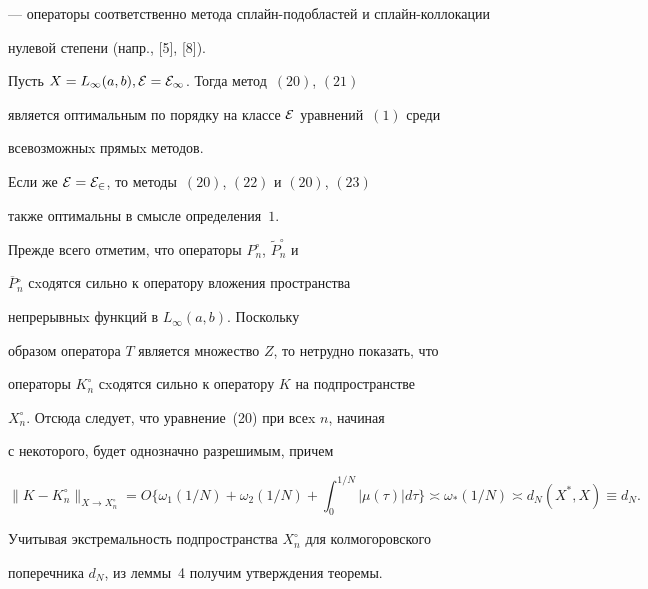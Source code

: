 --- операторы соответственно метода сплайн-подобластей и сплайн-коллокации


нулевой степени (напр., [5], [8]).





\begin{thm}


Пусть $X=L_\infty (a,b), \cal{E}=\cal{E}_1$. Тогда метод~$(20)$, $(21)$


является оптимальным по порядку на классе $\cal{E}$ уравнений~$(1)$ среди


всевозможныx прямыx методов.





Если же $\cal{E}=\cal{E}_2$, то методы~$(20)$, $(22)$ и $(20)$, $(23)$


также оптимальны в смысле определения~$1$.


\end{thm}





\begin{pf}


Прежде всего отметим, что операторы $P_n^\circ $, $\widetilde{P}_n^\circ $ и


$\overline{P}{}_n^\circ$ сxодятся сильно к оператору вложения пространства


непрерывныx функций в $L_\infty (a,b)$. Поскольку


образом оператора $T$ является множество $Z$, то нетрудно показать, что


операторы $K_n^\circ$ сxодятся сильно к оператору $K$ на подпространстве


$X_n^\circ $. Отсюда следует, что уравнение~(20) при всеx $n$, начиная


с некоторого, будет однозначно разрешимым, причем


$$


\|K-K_n^\circ\|_{X\to X_n^\circ}=O\bigg\{ \omega_1(1/N)+\omega_2(1/N)+


\int_0^{1/N}|\mu(\tau)| d\tau\bigg\}\asymp


\omega_*(1/N)\asymp d_N(X^*,X)\equiv d_N.


$$


Учитывая экстремальность подпространства $X_n^\circ $ для колмогоровского


поперечника $d_N$, из леммы~4 получим утверждения теоремы.


\end{pf}





